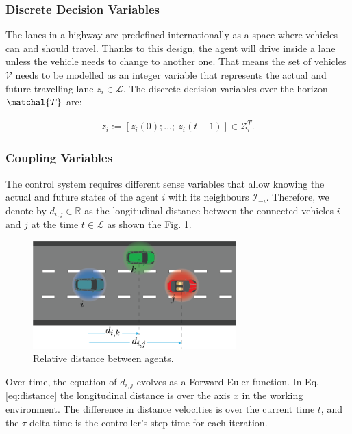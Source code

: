 \subsubsection{Discrete Decision Variables}
\label{discrete_decision_variables}
The lanes in a highway are predefined internationally as a space where vehicles can and should travel. Thanks to this design, the agent will drive inside a lane unless the vehicle needs to change to another one. That means the set of vehicles $\mathcal{V}$ needs to be modelled as an integer variable that represents the actual and future travelling lane $z_i \in \mathcal{L}$. The discrete decision variables over the horizon $\matchal{T}$ are:

\begin{gather*}
z_i := \left [ z_i(0); ...; \ z_i(t-1) \right ] \in \mathcal{Z}^T_i.
\end{gather*}



\subsubsection{Coupling Variables}



The control system requires different sense variables that allow knowing the actual and future states of the agent $i$ with its neighbours $\mathcal{I}_{-i}$. Therefore, we denote by $d_{i,j} \in \mathbb{R}$ as the longitudinal distance between the connected vehicles $i$ and $j$ at the time $t \in \mathcal{L}$ as shown the Fig. \ref{fig:distance}. 



\begin{figure}[H]
    \centering
    \includegraphics[width=0.7\textwidth]{Kap3/Asset 4.png}
    \caption{Relative distance between agents.}
    \label{fig:distance}
\end{figure}


Over time, the equation of $d_{i,j}$ evolves as a Forward-Euler function. In Eq. \ref{eq:distance} the longitudinal distance is over the axis $x$ in the working environment. The difference in distance velocities is over the current time $t$, and the $\tau$  delta time is the controller's step time for each iteration.

